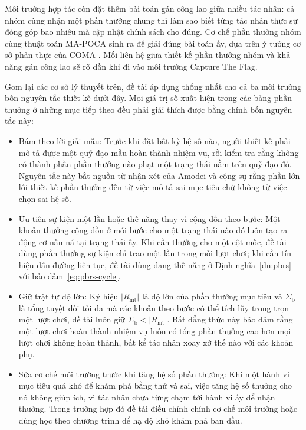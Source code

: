\indent Môi trường hợp tác còn đặt
thêm bài toán gán công lao giữa nhiều tác nhân: cả nhóm cùng nhận một phần thưởng chung
thì làm sao biết từng tác nhân thực sự đóng góp bao nhiêu mà cập nhật chính sách cho đúng.
Cơ chế phần thưởng nhóm cùng thuật toán MA-POCA \cite{cohen2022mapoca} sinh ra để giải
đúng bài toán ấy, dựa trên ý tưởng cơ sở phản thực của COMA
\cite{foerster2018counterfactual}. Mối liên hệ giữa thiết kế phần thưởng nhóm và khả năng
gán công lao sẽ rõ dần khi đi vào môi trường Capture The Flag.

\indent Gom lại các cơ sở lý thuyết trên, đề tài áp dụng thống nhất cho cả ba môi trường
bốn nguyên tắc thiết kế dưới đây. Mọi giá trị số xuất hiện trong các bảng phần thưởng ở
những mục tiếp theo đều phải giải thích được bằng chính bốn nguyên tắc này:
\begin{itemize}
    \item Bám theo lời giải mẫu: Trước khi đặt bất kỳ hệ số nào, người thiết
    kế phải mô tả được một quỹ đạo mẫu hoàn thành nhiệm vụ, rồi kiểm tra rằng không có
    thành phần phần thưởng nào phạt một trạng thái nằm trên quỹ đạo đó. Nguyên
    tắc này bắt nguồn từ nhận xét của Amodei và cộng sự \cite{amodei2016concrete} rằng
    phần lớn lỗi thiết kế phần thưởng đến từ việc mô tả sai mục tiêu chứ không từ việc
    chọn sai hệ số.

    \item Ưu tiên sự kiện một lần hoặc thế năng thay vì cộng dồn theo bước:
    Một khoản thưởng cộng dồn ở mỗi bước cho một trạng thái nào đó luôn tạo ra động cơ
    nấn ná tại trạng thái ấy. Khi cần thưởng cho một cột mốc, đề tài dùng phần thưởng
    sự kiện chỉ trao một lần trong mỗi lượt chơi; khi cần tín hiệu dẫn đường liên
    tục, đề tài dùng dạng thế năng ở Định nghĩa~\ref{dn:pbrs} với bảo đảm~\eqref{eq:pbrs-cycle}.

    \item Giữ trật tự độ lớn: Ký hiệu $|R_{\mathrm{mt}}|$ là độ lớn của phần
    thưởng mục tiêu và $\Sigma_{\mathrm{b}}$ là tổng tuyệt đối tối đa mà các khoản theo
    bước có thể tích lũy trong trọn một lượt chơi, đề tài luôn giữ
    $\Sigma_{\mathrm{b}} < |R_{\mathrm{mt}}|$. Bất đẳng thức này bảo đảm rằng một lượt
    chơi hoàn thành nhiệm vụ luôn có tổng phần thưởng cao hơn mọi lượt chơi không hoàn
    thành, bất kể tác nhân xoay xở thế nào với các khoản phụ.

    \item Sửa cơ chế môi trường trước khi tăng hệ số phần thưởng: Khi một hành
    vi mục tiêu quá khó để khám phá bằng thử và sai, việc tăng hệ số thưởng cho nó không
    giúp ích, vì tác nhân chưa từng chạm tới hành vi ấy để nhận thưởng. Trong trường hợp
    đó đề tài điều chỉnh chính cơ chế môi trường hoặc dùng học theo chương trình
    \cite{bengio2009curriculum} để hạ độ khó khám phá ban đầu.
\end{itemize}

